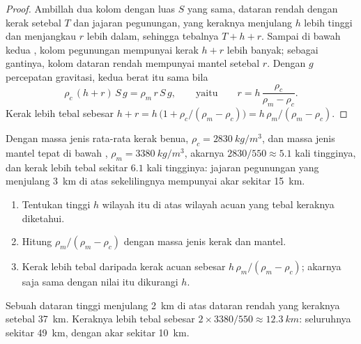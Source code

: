 \begin{proof}
Ambillah dua kolom dengan luas $S$ yang sama, dataran rendah dengan kerak
setebal $T$ dan jajaran pegunungan, yang keraknya menjulang $h$ lebih tinggi dan
menjangkau $r$ lebih dalam, sehingga tebalnya $T + h + r$. Sampai  di bawah kedua , kolom pegunungan mempunyai kerak $h + r$ lebih
banyak; sebagai gantinya, kolom dataran rendah mempunyai mantel setebal $r$.
Dengan $g$ percepatan gravitasi, kedua berat itu sama bila
\[
  \rho_c\,(h + r)\,S\,g = \rho_m\,r\,S\,g,
  \qquad\text{yaitu}\qquad
  r = h\,\frac{\rho_c}{\rho_m - \rho_c}.
\]
Kerak lebih tebal sebesar $h + r = h\,\bigl(1 + \rho_c/(\rho_m - \rho_c)\bigr)
= h\,\rho_m/(\rho_m - \rho_c)$.
\end{proof}

Dengan massa jenis rata-rata kerak benua, $\rho_c =
\qty{2830}{kg/m^3}$, dan massa jenis mantel tepat di bawah , $\rho_m =
\qty{3380}{kg/m^3}$, akarnya $2830/550 \approx 5.1$ kali tingginya, dan kerak
lebih tebal sekitar $6.1$ kali tingginya: jajaran pegunungan yang menjulang
\qty{3}{km} di atas sekelilingnya mempunyai akar sekitar \qty{15}{km}.

\begin{method}\label{met:g11:lithosphere-asthenosphere:root}
\begin{enumerate}
  \item Tentukan tinggi $h$ wilayah itu di atas wilayah acuan yang tebal
        keraknya diketahui.
  \item Hitung $\rho_m/(\rho_m - \rho_c)$ dengan massa jenis kerak dan
        mantel.
  \item Kerak lebih tebal daripada kerak acuan sebesar $h\,\rho_m/(\rho_m -
        \rho_c)$; akarnya saja sama dengan nilai itu dikurangi $h$.
\end{enumerate}
\end{method}

\begin{example}\label{ex:g11:lithosphere-asthenosphere:plateau}
Sebuah dataran tinggi menjulang \qty{2}{km} di atas dataran rendah yang keraknya
setebal \qty{37}{km}. Keraknya lebih tebal sebesar
$2 \times 3380/550 \approx \qty{12.3}{km}$: seluruhnya sekitar \qty{49}{km},
dengan akar sekitar \qty{10}{km}.
\end{example}

